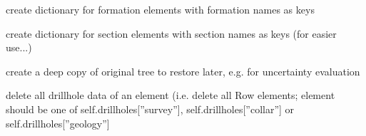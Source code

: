 \documentclass[letterpaper,10pt,english]{sphinxmanual}
\begin{document}
\begin{fulllineitems}
\begin{fulllineitems}
\end{fulllineitems}


\begin{fulllineitems}
\label{pygeomod:pygeomod.geomodeller_xml_obj.GeomodellerClass.create_formation_dict}
create dictionary for formation elements with formation names as keys

\end{fulllineitems}


\begin{fulllineitems}
\label{pygeomod:pygeomod.geomodeller_xml_obj.GeomodellerClass.create_sections_dict}
create dictionary for section elements with section names as keys
(for easier use...)

\end{fulllineitems}


\begin{fulllineitems}
\label{pygeomod:pygeomod.geomodeller_xml_obj.GeomodellerClass.deepcopy_tree}
create a deep copy of original tree to restore later, e.g. for uncertainty evaluation

\end{fulllineitems}


\begin{fulllineitems}
\label{pygeomod:pygeomod.geomodeller_xml_obj.GeomodellerClass.delete_drillhole_data}
delete all drillhole data of an element (i.e. delete
all Row elements; element should be one of
self.drillholes{[}''survey''{]}, self.drillholes{[}''collar''{]} 
or self.drillholes{[}''geology''{]}

\end{fulllineitems}



\end{fulllineitems}
\end{document}
